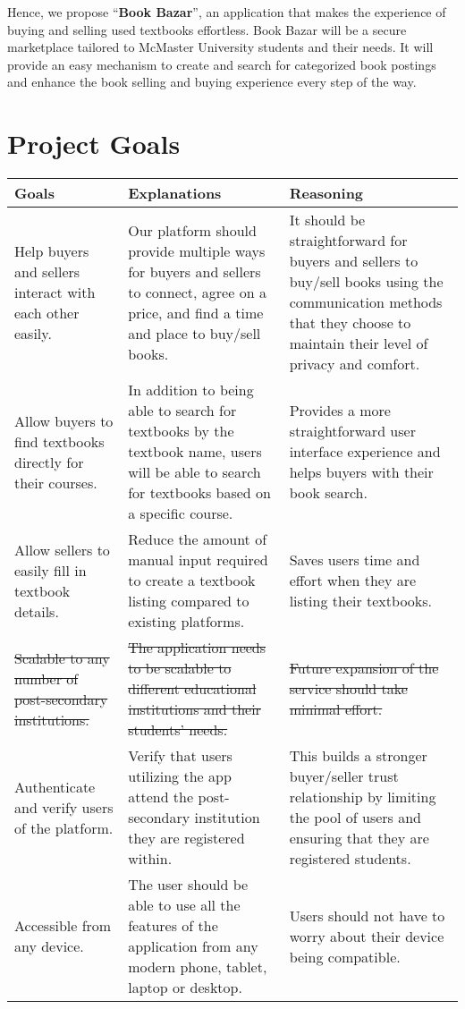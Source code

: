 \documentclass[fullpage]{article}
\newcommand{\bc}{\begin{center}}
\newcommand{\ec}{\end{center}}
\begin{document}
Hence, we propose “\textbf{Book Bazar}”, an application that makes the experience of buying and selling used textbooks effortless. Book Bazar will be a secure marketplace tailored to McMaster University students and their needs. It will provide an easy mechanism to create and search for categorized book postings and enhance the book selling and buying experience every step of the way.


\section{Project Goals}
\bc

\begin{tabular}{| p{4cm}| p{4cm}| p{4cm}|}

\hline
 \rowcolor{lightgray} 
\textbf{Goals} & \textbf{Explanations} &\textbf{Reasoning}\\
\hline
Help buyers and sellers interact with each other easily. & Our platform should provide multiple ways for buyers and sellers to connect, agree on a price, and find a time and place to buy/sell books. & It should be straightforward for buyers and sellers to buy/sell books using the communication methods that they choose to maintain their level of privacy and comfort.\\
\hline
 Allow buyers to find textbooks directly for their courses. & In addition to being able to search for textbooks by the textbook name, users will be able to search for textbooks based on a specific course. & Provides a more straightforward user interface experience and helps buyers with their book search.\\
\hline
Allow sellers to easily fill in textbook details. & Reduce the amount of manual input required to create a textbook listing compared to existing platforms. & Saves users time and effort when they are listing their textbooks.\\
\hline
 \sout{Scalable to any number of post-secondary institutions.} & \sout{The application needs to be scalable to different educational institutions and their students’ needs.} & \sout{Future expansion of the service should take minimal effort.}\\
\hline
Authenticate and verify users of the platform. & Verify that users utilizing the app attend the post-secondary institution they are registered within. & This builds a stronger buyer/seller trust relationship by limiting the pool of users and ensuring that they are registered students.\\
\hline
Accessible from any device. & The user should be able to use all the features of the application from any modern phone, tablet, laptop or desktop. & Users should not have to worry about their device being compatible.\\
\hline

\end{tabular}
\ec
\end{document}
